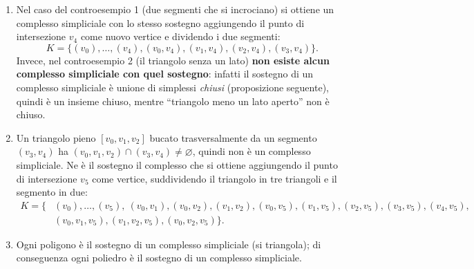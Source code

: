 \begin{ejemplo}
\begin{enumerate}
    \item[7)] Nel caso del controesempio 1 (due segmenti che si incrociano) si ottiene un complesso simpliciale con lo stesso sostegno aggiungendo il punto di intersezione $v_4$ come nuovo vertice e dividendo i due segmenti:
    \[
    K = \{ (v_0), \dots, (v_4), (v_0, v_4), (v_1, v_4), (v_2, v_4), (v_3, v_4) \}.
    \]
    Invece, nel controesempio 2 (il triangolo senza un lato) \textbf{non esiste alcun complesso simpliciale con quel sostegno}: infatti il sostegno di un complesso simpliciale \`e unione di simplessi \emph{chiusi} (proposizione seguente), quindi \`e un insieme chiuso, mentre ``triangolo meno un lato aperto'' non \`e chiuso.
    \item[8)] Un triangolo pieno $[v_0, v_1, v_2]$ bucato trasversalmente da un segmento $(v_3, v_4)$ ha $(v_0, v_1, v_2) \cap (v_3, v_4) \neq \varnothing$, quindi non \`e un complesso simpliciale. Ne \`e il sostegno il complesso che si ottiene aggiungendo il punto di intersezione $v_5$ come vertice, suddividendo il triangolo in tre triangoli e il segmento in due:
    \begin{align*}
    K = \{ & (v_0), \dots, (v_5),\ (v_0,v_1), (v_0,v_2), (v_1,v_2), (v_0,v_5), (v_1,v_5), (v_2,v_5), (v_3,v_5), (v_4,v_5), \\
    & (v_0,v_1,v_5), (v_1,v_2,v_5), (v_0,v_2,v_5) \}.
    \end{align*}
    \item[9)] Ogni poligono \`e il sostegno di un complesso simpliciale (si triangola); di conseguenza ogni poliedro \`e il sostegno di un complesso simpliciale.
\end{enumerate}
\end{ejemplo}

